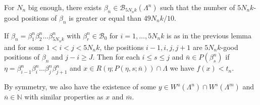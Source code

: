 \documentclass[10pt,a4paper]{amsart}
\begin{document}
\begin{lemma}\label{good} For $N_n$ big enough, there exists $\beta_n \in \mathcal{B}_{5N_n k}(\Lambda^{n})$ such that the number of  $5N_n k$-good positions of  $\beta_n$ is greater or equal than $49N_n k/10$.

\end{lemma}

\begin{proposition}\label{control}
If $\beta_n=\beta^n_1\beta^n_2\dots\beta^n_{5N_nk}$ with $\beta^n_r\in \mathcal{B}_0$ for $i=1, \dots, 5N_nk$ is as in the previous lemma and for some $1<i<j<5N_nk$, the positions $i-1,i,j,j+1$ are $5N_nk$-good positions of $\beta_n$ and $j-i \geq J$. Then for each $i\leq s \leq j$ and $\bar{n} \in P(\beta^n_s)$ if $\eta=\beta^n_{i-1}\beta^n_{i}\dots\beta^n_j\beta^n_{j+1}$ and $x\in R(\eta;P(\eta,s;\bar{n}))\cap \Lambda$ we have $f(x)<t_n$.
\end{proposition}

\begin{remark}
 By symmetry, we also have the existence of some $y\in W^u(\Lambda^n)\cap W^s(\Lambda^m)$ and $\overline{n}\in \mathbb{N}$ with similar properties as $x$ and $\overline{m}$. 
\end{remark}
\end{document}
